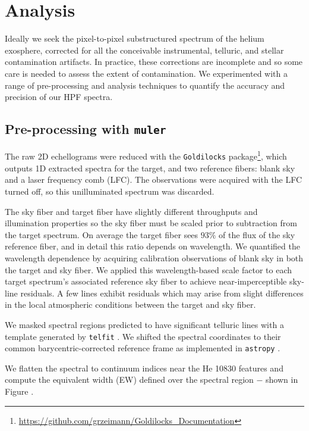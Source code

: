 \documentclass[modern]{aastex631}
\begin{document}
\section{Analysis}
Ideally we seek the pixel-to-pixel substructured spectrum of the helium exosphere, corrected for all the conceivable instrumental, telluric, and stellar contamination artifacts.  In practice, these corrections are incomplete and so some care is needed to assess the extent of contamination.  We experimented with a range of pre-processing and analysis techniques to quantify the accuracy and precision of our HPF spectra.

\subsection{Pre-processing with \texttt{muler} }

The raw 2D echellograms were reduced with the \texttt{Goldilocks} package\footnote{\url{https://github.com/grzeimann/Goldilocks_Documentation}}, which outputs 1D extracted spectra for the target, and two reference fibers: blank sky and a laser frequency comb (LFC).  The observations were acquired with the LFC turned off, so this unilluminated spectrum was discarded.

The sky fiber and target fiber have slightly different throughputs and illumination properties so the sky fiber must be scaled prior to subtraction from the target spectrum.  On average the target fiber sees $93\%$ of the flux of the sky reference fiber, and in detail this ratio depends on wavelength.  We quantified the wavelength dependence by acquiring calibration observations of blank sky in both the target and sky fiber.  We applied this wavelength-based scale factor to each target spectrum's associated reference sky fiber to achieve near-imperceptible sky-line residuals.  A few lines exhibit residuals which may arise from slight differences in the local atmospheric conditions between the target and sky fiber.

We masked spectral regions predicted to have significant telluric lines with a template generated by \texttt{telfit} \citep{2014AJ....148...53G}.  We shifted the spectral coordinates to their common barycentric-corrected reference frame \citep{2014PASP..126..838W} as implemented in \texttt{astropy} \citep{2013A&A...558A..33A,2018AJ....156..123A}.

We flatten the spectral to continuum indices near the He 10830 features and compute the equivalent width (EW) defined over the spectral region $-$ shown in Figure .
\end{document}
